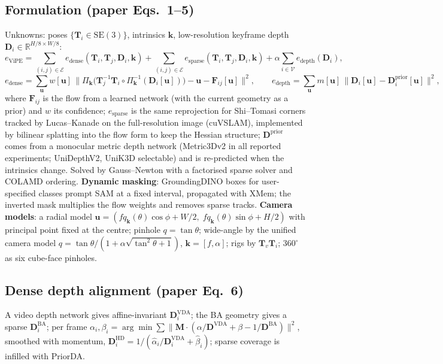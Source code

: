\documentclass[10pt,a4paper]{article}
\newcommand{\R}{\mathbb{R}}
\begin{document}
\subsection{Formulation (paper Eqs.~1--5)}
Unknowns: poses $\{\mathbf{T}_i\in\mathrm{SE}(3)\}$, intrinsics $\bm k$, low-resolution keyframe depth
$\mathbf{D}_i\in\R^{H/8\times W/8}$:
\begin{equation}
e_\text{ViPE} = \sum_{(i,j)\in\mathcal E} e_\text{dense}(\mathbf T_i,\mathbf T_j,\mathbf D_i,\bm k)
+ \sum_{(i,j)\in\mathcal E} e_\text{sparse}(\mathbf T_i,\mathbf T_j,\mathbf D_i,\bm k)
+ \alpha\sum_{i\in\mathcal V} e_\text{depth}(\mathbf D_i),
\end{equation}
\begin{equation}
e_\text{dense} = \sum_{\bm u} w[\bm u]\,\big\|\Pi_{\bm k}\big(\mathbf T_j^{-1}\mathbf T_i\circ\Pi_{\bm k}^{-1}(\mathbf D_i[\bm u])\big) - \bm u - \mathbf F_{ij}[\bm u]\big\|^2,
\qquad
e_\text{depth} = \sum_{\bm u} m[\bm u]\,\big\|\mathbf D_i[\bm u] - \mathbf D_i^\text{prior}[\bm u]\big\|^2,
\end{equation}
where $\mathbf F_{ij}$ is the flow from a learned network (with the current geometry as a prior) and $w$ its
confidence; $e_\text{sparse}$ is the same reprojection for Shi--Tomasi corners tracked by Lucas--Kanade on the
full-resolution image (cuVSLAM), implemented by bilinear splatting into the flow form to keep the Hessian
structure; $\mathbf D^\text{prior}$ comes from a monocular metric depth network (Metric3Dv2 in all reported
experiments; UniDepthV2, UniK3D selectable) and is re-predicted when the intrinsics change. Solved by
Gauss--Newton with a factorised sparse solver and COLAMD ordering. \textbf{Dynamic masking}: GroundingDINO
boxes for user-specified classes prompt SAM at a fixed interval, propagated with XMem; the inverted mask
multiplies the flow weights and removes sparse tracks. \textbf{Camera models}: a radial model
$\bm u = (f q_{\bm k}(\theta)\cos\phi + W/2,\; f q_{\bm k}(\theta)\sin\phi + H/2)$ with principal point fixed at the
centre; pinhole $q = \tan\theta$; wide-angle by the unified camera model $q = \tan\theta/(1+\alpha\sqrt{\tan^2\theta+1})$,
$\bm k = [f, \alpha]$; rigs by $\mathbf T_v\mathbf T_i$; 360$^\circ$ as six cube-face pinholes.

\subsection{Dense depth alignment (paper Eq.~6)}
A video depth network gives affine-invariant $\mathbf D^\text{VDA}_i$; the BA geometry gives a sparse
$\mathbf D^\text{BA}_i$; per frame $\alpha_i,\beta_i = \arg\min \sum \|\mathbf M\cdot(\alpha/\mathbf D^\text{VDA} + \beta - 1/\mathbf D^\text{BA})\|^2$,
smoothed with momentum, $\mathbf D^\text{HD}_i = 1/(\hat\alpha_i/\mathbf D^\text{VDA}_i + \hat\beta_i)$; sparse coverage is
infilled with PriorDA.
\end{document}
